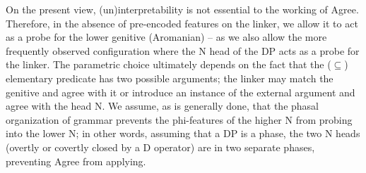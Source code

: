 \documentclass[output=paper]{langsci/langscibook}
\begin{document}
  On the present view, (un)interpretability is not essential to the working of Agree. Therefore, in the absence of pre-encoded features on the linker, we allow it to act as a probe for the lower genitive (Aromanian) – as we also allow the more frequently observed configuration where the N head of the DP acts as a probe for the linker. The parametric choice ultimately depends on the fact that the ($\subseteq$) elementary predicate has two possible arguments; the linker may match the genitive and agree with it or introduce an instance of the external argument and agree with the head N. We assume, as is generally done, that the phasal organization of grammar prevents the phi-features of the higher N from probing into the lower N; in other words, assuming that a DP is a phase, the two N heads (overtly or covertly closed by a D operator) are in two separate phases, preventing Agree from applying.  
\end{document}
